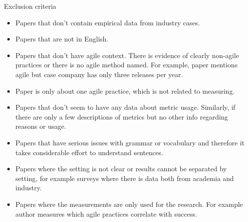 \documentclass{sig-alternate}
\newcommand{\juha}[1]{\ignorespaces}
\begin{document}
Exclusion criteria\juha{Tiivistin exclusion kriteerej�}
\begin{itemize}
  \item Papers that don't contain empirical data from industry cases.
  \item Papers that are not in English.
  \item Papers that don't have agile context. There is evidence of
  clearly non-agile practices or there is no agile method named. For example,
  paper mentions agile but case company has only three releases per year.
  \item Paper is only about one agile practice, which is not related to
  measuring.
  \item Papers that don't seem to have any data about metric usage. Similarly,
  if there are only a few descriptions of metrics but no other info regarding
  reasons or usage.
  \item Papers that have serious issues with grammar or vocabulary and
  therefore it takes considerable effort to understand sentences.
  \item Papers where the setting is not clear or results cannot be separated by setting, for example
  surveys where there is data both from academia and industry. %

  \item Papers where the measurements are only used for the research. For
  example author measures which agile practices correlate with success.
\end{itemize}
\end{document}
